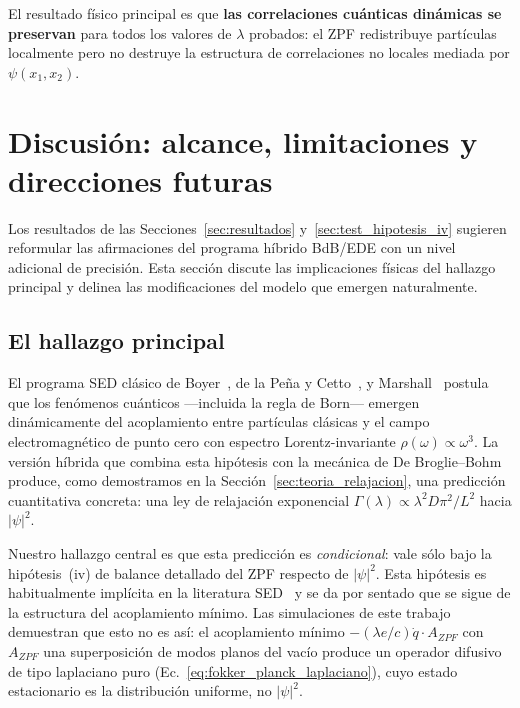 \documentclass[11pt,a4paper]{article}
\begin{document}
El resultado físico principal es que \textbf{las correlaciones
cuánticas dinámicas se preservan} para todos los valores de $\lambda$
probados: el ZPF redistribuye partículas localmente pero no destruye
la estructura de correlaciones no locales mediada por $\psi(x_1,x_2)$.

\section{Discusión: alcance, limitaciones y direcciones futuras}
\label{sec:discusion}

Los resultados de las Secciones~\ref{sec:resultados}
y~\ref{sec:test_hipotesis_iv} sugieren reformular las afirmaciones del
programa híbrido BdB/EDE con un nivel adicional de precisión. Esta
sección discute las implicaciones físicas del hallazgo principal y
delinea las modificaciones del modelo que emergen naturalmente.

\subsection{El hallazgo principal}
\label{sec:hallazgo_principal}

El programa SED clásico de Boyer~\cite{Boyer1975}, de la Peña y
Cetto~\cite{delaPenaCetto1996}, y Marshall~\cite{Marshall1963} postula
que los fenómenos cuánticos ---incluida la regla de Born--- emergen
dinámicamente del acoplamiento entre partículas clásicas y el campo
electromagnético de punto cero con espectro Lorentz-invariante
$\rho(\omega)\propto\omega^3$. La versión híbrida que combina esta
hipótesis con la mecánica de De Broglie--Bohm produce, como demostramos
en la Sección~\ref{sec:teoria_relajacion}, una predicción cuantitativa
concreta: una ley de relajación exponencial
$\Gamma(\lambda)\propto\lambda^2 D\pi^2/L^2$ hacia $|\psi|^2$.

Nuestro hallazgo central es que esta predicción es \emph{condicional}:
vale sólo bajo la hipótesis~(iv) de balance detallado del ZPF respecto
de $|\psi|^2$. Esta hipótesis es habitualmente implícita en la
literatura SED~\cite{Boyer1975,delaPenaCetto1996} y se da por sentado
que se sigue de la estructura del acoplamiento mínimo. Las simulaciones
de este trabajo demuestran que esto no es así: el acoplamiento mínimo
$-(\lambda e/c)\dot q\cdot A_{ZPF}$ con $A_{ZPF}$ una superposición de
modos planos del vacío produce un operador difusivo de tipo laplaciano
puro (Ec.~\ref{eq:fokker_planck_laplaciano}), cuyo estado estacionario
es la distribución uniforme, no $|\psi|^2$.
\end{document}
